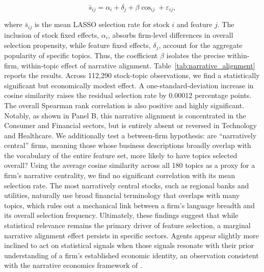 \begin{equation}\label{eq:narrative_reg}
\bar{s}_{ij} = \alpha_i + \delta_j + \beta \cos_{ij} + \varepsilon_{ij},
\end{equation}

where $\bar{s}_{ij}$ is the mean LASSO selection rate for stock $i$ and feature $j$.
The inclusion of stock fixed effects, $\alpha_i$, absorbs firm-level differences in overall selection propensity, while feature fixed effects, $\delta_j$, account for the aggregate popularity of specific topics.
Thus, the coefficient $\beta$ isolates the precise within-firm, within-topic effect of narrative alignment.
Table~\ref{tab:narrative_alignment} reports the results.
Across 112,290 stock-topic observations, we find a statistically significant but economically modest effect. 
A one-standard-deviation increase in cosine similarity raises the residual selection rate by 0.00012 percentage points.
The overall Spearman rank correlation is also positive and highly significant.
Notably, as shown in Panel B, this narrative alignment is concentrated in the Consumer and Financial sectors, but is entirely absent or reversed in Technology and Healthcare.
We additionally test a between-firm hypothesis: are ``narratively central'' firms, meaning those whose business descriptions broadly overlap with the vocabulary of the entire feature set, more likely to have topics selected overall?
Using the average cosine similarity across all 180 topics as a proxy for a firm's narrative centrality, we find no significant correlation with its mean selection rate.
The most narratively central stocks, such as regional banks and utilities, naturally use broad financial terminology that overlaps with many topics, which rules out a mechanical link between a firm's language breadth and its overall selection frequency.
Ultimately, these findings suggest that while statistical relevance remains the primary driver of feature selection, a marginal narrative alignment effect persists in specific sectors.
Agents appear slightly more inclined to act on statistical signals when those signals resonate with their prior understanding of a firm's established economic identity, an observation consistent with the narrative economics framework of \citet{Shiller2017}.

